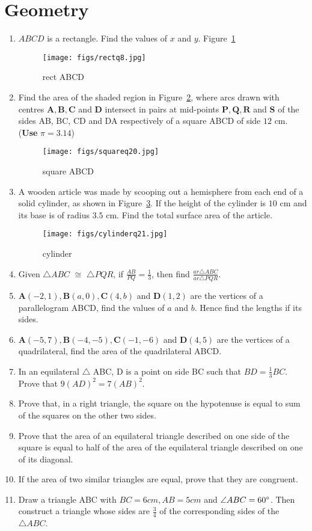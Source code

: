 \documentclass{article}
\let\vec\mathbf
\newcommand{\figref}[1]{Figure~\ref{#1}}
\begin{document}
	\section{Geometry}
	\begin{enumerate}[label=(\roman*)]
	\item $ABCD$ is a rectangle. Find the values of $x$ and $y$.
		\figref{fig:Fig1}
	\begin{figure}[H]
		\centering
		\texttt{[image: figs/rectq8.jpg]}
		\caption{rect ABCD}
		\label{fig:Fig1}
	\end{figure}
\item Find the area of the shaded region in \figref{fig:Fig2}, where arcs drawn with centres $\vec{A,B,C}$ and $\vec{D}$ intersect in pairs at mid-points $\vec{P, Q, R}$ and $\vec{S}$ of the sides AB, BC, CD and DA respectively of a square ABCD of side $12$ cm. ({\textbf{Use}}  $\pi  = 3.14  $)
	\begin{figure}[H]
		\centering
		\texttt{[image: figs/squareq20.jpg]}
		\caption{square ABCD}
		\label{fig:Fig2}
	\end{figure}
\item A wooden article was made by scooping out a hemisphere from each end of a solid cylinder, as shown in \figref{fig:Fig3}. If the height of the cylinder is $10$ cm and its base is of radius $3.5$ cm. Find the total surface area of the article.
	
	\begin{figure}[H]
		\centering
		\texttt{[image: figs/cylinderq21.jpg]}
		\caption{cylinder}
		\label{fig:Fig3}
	\end{figure} 
	\item Given $\triangle ABC$ $\cong$  $\triangle PQR$, if $\frac{AB}{PQ} = \frac{1}{3}$, then find $\frac{ar \triangle ABC}{ar \triangle PQR}$.
	\item $\vec{A}(-2,1), \vec{B}(a,0), \vec{C}(4,b)$ and  $\vec{D}(1,2)$ are the vertices of a parallelogram {ABCD}, find the values of $a$ and $b$. Hence find the lengths if its sides.
	\item $\vec{A}(-5,7), \vec{B}(-4,-5), \vec{C}(-1,-6)$ and $\vec{D}(4,5)$ are the vertices of a quadrilateral, find the area of the quadrilateral ABCD.
	\item In an equilateral $\triangle$ ABC, D is a point on side BC such that $ BD =\frac{1}{3}BC$. Prove that $9(AD)^2 = 7(AB)^2$.
	\item Prove that, in a right triangle, the  square on the hypotenuse is equal to sum of the squares on the other two sides.
	\item Prove that the area of an equilateral triangle described on one side of the square is equal to half of the area of the equilateral triangle described on one of its diagonal.
	\item If the area of two similar triangles are equal, prove that they are congruent.
	\item Draw a triangle ABC with $BC=6 cm, AB=5 cm$ and $\angle{ABC}=60\degree$. Then construct a triangle whose sides are $\frac{3}{4}$ of the corresponding sides of the $\triangle ABC$.
\end{enumerate}
\end{document}
